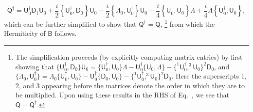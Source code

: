 \begin{equation}
  \mathsf{Q}^{\dagger} =  \mathsf{U}_{0}^{\dagger}\mathsf{D}_{1}\mathsf{U}_{0} + \frac{i}{2}\left\{\mathsf{U}_{0}^{\dagger},   \mathsf{D}_{0}\right\}\mathsf{U}_{0} - \frac{i}{2}\left\{\Lambda_{0}, \mathsf{U}_{0}^{\dagger}\right\}\mathsf{U}_{0}
  - \frac{i}{4}\left\{\mathsf{U}_{0}^{\dagger}, \mathsf{U}_{0}\right\}\Lambda
  + \frac{i}{4}\Lambda\left\{\mathsf{U}_{0}^{\dagger}, \mathsf{U}_{0}\right\},
\end{equation}
%
which can be further simplified to show that $\mathsf{Q}^{\dagger} = \mathsf{Q}$,%
\footnote{The simplification proceeds (by explicitly computing matrix entries) by first showing that
  $\{\mathsf{U}_{0}^{\dagger}, \mathsf{D}_{0}\}\mathsf{U}_{0} = \{\mathsf{U}_{0}^{\dagger}, \mathsf{U}_{0}\}\Lambda - \mathsf{U}_{0}^{\dagger}\{\mathsf{U}_{0}, \Lambda\} - \{ ^{1}\mathsf{U}_{0}^{\dagger}, ^{3}\mathsf{U}_{0}\}^{2}\mathsf{D}_{0}$,
  and
  $\{\Lambda_{0}, \mathsf{U}_{0}^{\dagger}\} = \Lambda_{0}\{\mathsf{U}_{0}^{\dagger},\mathsf{U}_{0}\} - \mathsf{U}_{0}^{\dagger}\{\mathsf{D}_{0},\mathsf{U}_{0}\} - \{^{1}\mathsf{U}_{0}^{\dagger},^{3}\mathsf{U}_{0}\}^{2}\mathsf{D}_{0}$.
  Here the superscripts 1, 2, and 3 appearing before the matrices denote the order in which they are to be multiplied.
  Upon using these results in the RHS of Eq.~\fixme, we see that $\mathsf{Q}=\mathsf{Q}^{\dagger}$.
}
from which the Hermiticity of $\mathsf{B}$ follows.

